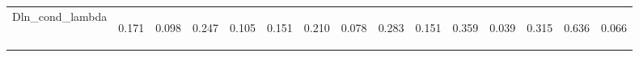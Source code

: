 \begin{center}
\begin{tabular}{lcccccccccccccc}
\noalign{\smallskip}Dln_cond_lambda & \begin{normalsize}0.171\end{normalsize} & \begin{normalsize}0.098\end{normalsize} & \begin{normalsize}0.247\end{normalsize} & \begin{normalsize}0.105\end{normalsize} & \begin{normalsize}0.151\end{normalsize} & \begin{normalsize}0.210\end{normalsize} & \begin{normalsize}0.078\end{normalsize} & \begin{normalsize}0.283\end{normalsize} & \begin{normalsize}0.151\end{normalsize} & \begin{normalsize}0.359\end{normalsize} & \begin{normalsize}0.039\end{normalsize} & \begin{normalsize}0.315\end{normalsize} & \begin{normalsize}0.636\end{normalsize} & \begin{normalsize}0.066\end{normalsize}\\

\end{tabular}
\end{center}
